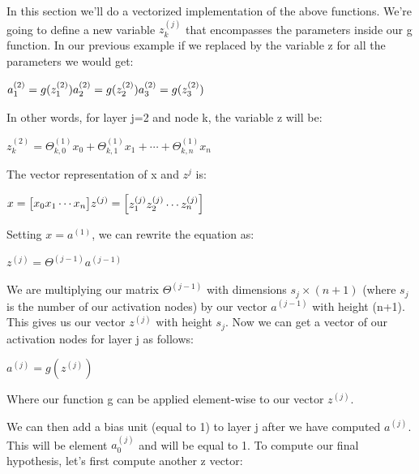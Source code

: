 \documentclass[
]{article}
\begin{document}
In this section we'll do a vectorized implementation of the above
functions. We're going to define a new variable \(z_k^{(j)}\) that
encompasses the parameters inside our g function. In our previous
example if we replaced by the variable z for all the parameters we would
get:

\(\begin{align*}a_1^{(2)} = g(z_1^{(2)}) \newline a_2^{(2)} = g(z_2^{(2)}) \newline a_3^{(2)} = g(z_3^{(2)}) \newline \end{align*}\)

In other words, for layer j=2 and node k, the variable z will be:

\(z_k^{(2)} = \Theta_{k,0}^{(1)}x_0 + \Theta_{k,1}^{(1)}x_1 + \cdots + \Theta_{k,n}^{(1)}x_n\)

The vector representation of x and \(z^{j}\) is:

\(\begin{align*}x = \begin{bmatrix}x_0 \newline x_1 \newline\cdots \newline x_n\end{bmatrix} &z^{(j)} = \begin{bmatrix}z_1^{(j)} \newline z_2^{(j)} \newline\cdots \newline z_n^{(j)}\end{bmatrix}\end{align*}\)

Setting \(x = a^{(1)}\), we can rewrite the equation as:

\(z^{(j)} = \Theta^{(j-1)}a^{(j-1)}\)

We are multiplying our matrix \(\Theta^{(j-1)}\) with dimensions
\(s_j\times (n+1)\) (where \(s_j\) is the number of our activation
nodes) by our vector \(a^{(j-1)}\) with height (n+1). This gives us our
vector \(z^{(j)}\) with height \(s_j\). Now we can get a vector of our
activation nodes for layer j as follows:

\(a^{(j)} = g(z^{(j)})\)

Where our function g can be applied element-wise to our vector
\(z^{(j)}\).

We can then add a bias unit (equal to 1) to layer j after we have
computed \(a^{(j)}\). This will be element \(a_0^{(j)}\) and will be
equal to 1. To compute our final hypothesis, let's first compute another
z vector:
\end{document}
